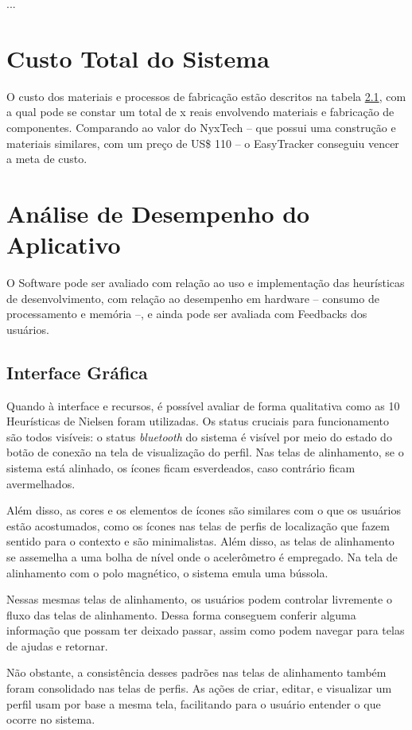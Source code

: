 ...



\section{Custo Total do Sistema}
O custo dos materiais e processos de fabricação estão descritos na tabela \ref{}, com a qual pode se constar um total de x reais envolvendo materiais e fabricação de componentes. Comparando ao valor do NyxTech -- que possui uma construção e materiais similares, com um preço de US\$ 110 -- o EasyTracker conseguiu vencer a meta de custo.  

\section{Análise de Desempenho do Aplicativo}
O Software pode ser avaliado com relação ao uso e implementação das heurísticas de desenvolvimento, com relação ao desempenho em hardware -- consumo de processamento e memória --, e ainda pode ser avaliada com Feedbacks dos usuários. 

\subsection{Interface Gráfica}
Quando à interface e recursos, é possível avaliar de forma qualitativa como as 10 Heurísticas de Nielsen foram utilizadas. Os status cruciais para funcionamento são todos visíveis: o status \textit{bluetooth} do sistema é visível por meio do estado do botão de conexão na tela de visualização do perfil. Nas telas de alinhamento, se o sistema está alinhado, os ícones ficam esverdeados, caso contrário ficam avermelhados.

Além disso, as cores e os elementos de ícones são similares com o que os usuários estão acostumados, como os ícones nas telas de perfis de localização que fazem sentido para o contexto e são minimalistas. Além disso, as telas de alinhamento se assemelha a uma bolha de nível onde o acelerômetro é empregado. Na tela de alinhamento com o polo magnético, o sistema emula uma bússola. 

Nessas mesmas telas de alinhamento, os usuários podem controlar livremente o fluxo das telas de alinhamento. Dessa forma conseguem conferir alguma informação que possam ter deixado passar, assim como podem navegar para telas de ajudas e retornar.

Não obstante, a consistência desses padrões nas telas de alinhamento também foram consolidado nas telas de perfis. As ações de criar, editar, e visualizar um perfil usam por base a mesma tela, facilitando para o usuário entender o que ocorre no sistema. 

